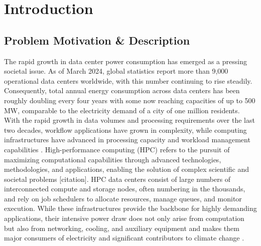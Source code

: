\section{Introduction}
\label{cha:introduction}

\subsection{Problem Motivation \& Description}
\label{subse:problem_motivation_description}
The rapid growth in data center power consumption has emerged as a pressing societal issue. As of March 2024, global statistics report more than 9,000 operational data centers worldwide, with this number continuing to rise steadily. Consequently, total annual energy consumption across data centers has been roughly doubling every four years with some now reaching capacities of up to 500 MW, comparable to the electricity demand of a city of one million residents. With the rapid growth in data volumes and processing requirements over the last two decades, workflow applications have grown in complexity, while computing infrastructures have advanced in processing capacity and workload management capabilities \cite{Coleman_2021}.
High-performance computing (HPC) refers to the pursuit of maximizing computational capabilities through advanced technologies, methodologies, and applications, enabling the solution of complex scientific and societal problems [citation]. HPC data centers consist of large numbers of interconnected compute and storage nodes, often numbering in the thousands, and rely on job schedulers to allocate resources, manage queues, and monitor execution. While these infrastructures provide the backbone for highly demanding applications, their intensive power draw does not only arise from computation but also from networking, cooling, and auxiliary equipment and makes them major consumers of electricity and significant contributors to climate change \cite{Silva_2024}.

